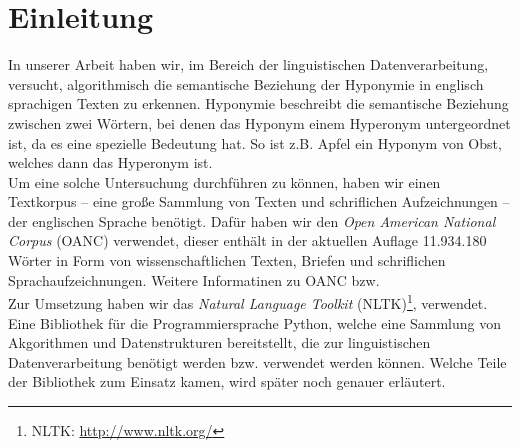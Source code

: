 \section{Einleitung}

In unserer Arbeit haben wir, im Bereich der linguistischen
Datenverarbeitung, versucht, algorithmisch die semantische
Beziehung der Hyponymie in englisch sprachigen Texten zu erkennen.
Hyponymie beschreibt die semantische Beziehung zwischen zwei Wörtern,
bei denen das Hyponym einem Hyperonym untergeordnet ist, da es eine
spezielle Bedeutung hat. So ist z.B. Apfel ein Hyponym von Obst,
welches dann das Hyperonym ist. \cite{bib:Glueck2005}%
\\%
Um eine solche Untersuchung durchführen zu können, haben wir einen
Textkorpus -- eine große Sammlung von Texten und schriflichen
Aufzeichnungen -- der englischen Sprache benötigt. Dafür haben wir den
\textit{Open American National Corpus} (OANC) verwendet, dieser
enthält in der aktuellen Auflage 11.934.180 Wörter in Form von
wissenschaftlichen Texten, Briefen und schriflichen
Sprachaufzeichnungen. Weitere Informatinen zu OANC bzw. \cite{bib:Ide2002}%
\\%
Zur Umsetzung haben wir das \textit{Natural Language Toolkit}
(NLTK)\footnote{NLTK: \url{http://www.nltk.org/}},
verwendet. Eine Bibliothek für die Programmiersprache Python, welche
eine Sammlung von Akgorithmen und Datenstrukturen bereitstellt, die zur
linguistischen Datenverarbeitung benötigt werden bzw. verwendet werden
können. \cite{bib:Bird2006} Welche Teile der Bibliothek zum Einsatz
kamen, wird später noch genauer erläutert.%